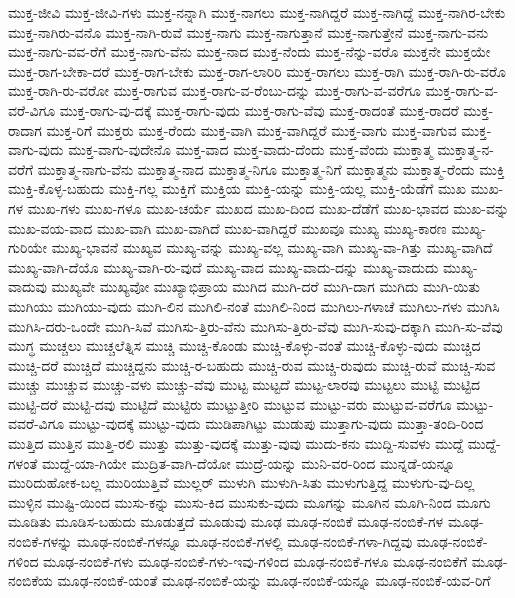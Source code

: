 {ಮುಕ್ತ-ಜೀವಿ
ಮುಕ್ತ-ಜೀವಿ-ಗಳು
ಮುಕ್ತ-ನನ್ನಾಗಿ
ಮುಕ್ತ-ನಾಗಲು
ಮುಕ್ತ-ನಾಗಿದ್ದರೆ
ಮುಕ್ತ-ನಾಗಿದ್ದೆ
ಮುಕ್ತ-ನಾಗಿರ-ಬೇಕು
ಮುಕ್ತ-ನಾಗಿರು-ವನೊ
ಮುಕ್ತ-ನಾಗಿ-ರುವೆ
ಮುಕ್ತ-ನಾಗು
ಮುಕ್ತ-ನಾಗುತ್ತಾನೆ
ಮುಕ್ತ-ನಾಗುತ್ತೇನೆ
ಮುಕ್ತ-ನಾಗು-ವನು
ಮುಕ್ತ-ನಾಗು-ವವ-ರೆಗೆ
ಮುಕ್ತ-ನಾಗು-ವೆನು
ಮುಕ್ತ-ನಾದ
ಮುಕ್ತ-ನೆಂದು
ಮುಕ್ತ-ನೆನ್ನು-ವರೊ
ಮುಕ್ತನೇ
ಮುಕ್ತಯೇ
ಮುಕ್ತ-ರಾಗ-ಬೇಕಾ-ದರೆ
ಮುಕ್ತ-ರಾಗ-ಬೇಕು
ಮುಕ್ತ-ರಾಗ-ಲಾರಿರಿ
ಮುಕ್ತ-ರಾಗಲು
ಮುಕ್ತ-ರಾಗಿ
ಮುಕ್ತ-ರಾಗಿ-ರು-ವರೊ
ಮುಕ್ತ-ರಾಗಿ-ರು-ವರೋ
ಮುಕ್ತ-ರಾಗುವ
ಮುಕ್ತ-ರಾಗು-ವ-ರೆಂಬು-ದನ್ನು
ಮುಕ್ತ-ರಾಗು-ವ-ವರೆಗೂ
ಮುಕ್ತ-ರಾಗು-ವ-ವರೆ-ವಿಗೂ
ಮುಕ್ತ-ರಾಗು-ವು-ದಕ್ಕೆ
ಮುಕ್ತ-ರಾಗು-ವುದು
ಮುಕ್ತ-ರಾಗು-ವೆವು
ಮುಕ್ತ-ರಾದಂತೆ
ಮುಕ್ತ-ರಾದರೆ
ಮುಕ್ತ-ರಾದಾಗ
ಮುಕ್ತ-ರಿಗೆ
ಮುಕ್ತರು
ಮುಕ್ತ-ರೆಂದು
ಮುಕ್ತ-ವಾಗಿ
ಮುಕ್ತ-ವಾಗಿದ್ದರೆ
ಮುಕ್ತ-ವಾಗು
ಮುಕ್ತ-ವಾಗುವ
ಮುಕ್ತ-ವಾಗು-ವುದು
ಮುಕ್ತ-ವಾಗು-ವುದೇನೊ
ಮುಕ್ತ-ವಾದ
ಮುಕ್ತ-ವಾದು-ದೆಂದು
ಮುಕ್ತ-ವೆಂದು
ಮುಕ್ತಾತ್ಮ
ಮುಕ್ತಾತ್ಮ-ನ-ವರೆಗೆ
ಮುಕ್ತಾತ್ಮ-ನಾಗು-ವೆನು
ಮುಕ್ತಾತ್ಮ-ನಾದ
ಮುಕ್ತಾತ್ಮ-ನಿಗೂ
ಮುಕ್ತಾತ್ಮ-ನಿಗೆ
ಮುಕ್ತಾತ್ಮನು
ಮುಕ್ತಾತ್ಮ-ರೆಂದು
ಮುಕ್ತಿ
ಮುಕ್ತಿ-ಕೊಳ್ಳ-ಬಹುದು
ಮುಕ್ತಿ-ಗಲ್ಲ
ಮುಕ್ತಿಗೆ
ಮುಕ್ತಿಯ
ಮುಕ್ತಿ-ಯನ್ನು
ಮುಕ್ತಿ-ಯಲ್ಲ
ಮುಕ್ತಿ-ಯೆಡೆಗೆ
ಮುಖ
ಮುಖ-ಗಳ
ಮುಖ-ಗಳು
ಮುಖ-ಗಳೂ
ಮುಖ-ಚರ್ಯೆ
ಮುಖದ
ಮುಖ-ದಿಂದ
ಮುಖ-ದೆಡೆಗೆ
ಮುಖ-ಭಾವದ
ಮುಖ-ವನ್ನು
ಮುಖ-ವಯ-ವಾದ
ಮುಖ-ವಾಗಿ
ಮುಖ-ವಾಗಿದೆ
ಮುಖ-ವಾಗಿದ್ದರೆ
ಮುಖವೂ
ಮುಖ್ಯ
ಮುಖ್ಯ-ಕಾರಣ
ಮುಖ್ಯ-ಗುರಿಯೇ
ಮುಖ್ಯ-ಭಾವನೆ
ಮುಖ್ಯವ
ಮುಖ್ಯ-ವನ್ನು
ಮುಖ್ಯ-ವಲ್ಲ
ಮುಖ್ಯ-ವಾಗಿ
ಮುಖ್ಯ-ವಾ-ಗಿತ್ತು
ಮುಖ್ಯ-ವಾಗಿದೆ
ಮುಖ್ಯ-ವಾಗಿ-ದೆಯೊ
ಮುಖ್ಯ-ವಾಗಿ-ರು-ವುದೆ
ಮುಖ್ಯ-ವಾದ
ಮುಖ್ಯ-ವಾದು-ದನ್ನು
ಮುಖ್ಯ-ವಾದುದು
ಮುಖ್ಯ-ವಾದುವು
ಮುಖ್ಯವೇ
ಮುಖ್ಯವೋ
ಮುಖ್ಯಾಭಿಪ್ರಾಯ
ಮುಗಿದ
ಮುಗಿ-ದರೆ
ಮುಗಿ-ದಾಗ
ಮುಗಿದು
ಮುಗಿ-ಯಿತು
ಮುಗಿಯು
ಮುಗಿಯು-ವುದು
ಮುಗಿ-ಲಿನ
ಮುಗಿಲಿ-ನಂತೆ
ಮುಗಿಲಿ-ನಿಂದ
ಮುಗಿಲು-ಗಳಾಚೆ
ಮುಗಿಲು-ಗಳು
ಮುಗಿಸಿ
ಮುಗಿಸಿ-ದರು-ಒಂದೇ
ಮುಗಿ-ಸಿವೆ
ಮುಗಿಸು-ತ್ತಿರು-ವೆನು
ಮುಗಿಸು-ತ್ತಿರು-ವೆವು
ಮುಗಿ-ಸುವು-ದಕ್ಕಾಗಿ
ಮುಗಿ-ಸು-ವೆವು
ಮುಗ್ಧ
ಮುಚ್ಚಲು
ಮುಚ್ಚಲೆತ್ನಿಸ
ಮುಚ್ಚಿ
ಮುಚ್ಚಿ-ಕೊಂಡು
ಮುಚ್ಚಿ-ಕೊಳ್ಳು-ವಂತೆ
ಮುಚ್ಚಿ-ಕೊಳ್ಳು-ವುದು
ಮುಚ್ಚಿದ
ಮುಚ್ಚಿ-ದರೆ
ಮುಚ್ಚಿದೆ
ಮುಚ್ಚಿದ್ದನು
ಮುಚ್ಚಿ-ರ-ಬಹುದು
ಮುಚ್ಚಿ-ರುವ
ಮುಚ್ಚಿ-ರುವುದು
ಮುಚ್ಚಿ-ರುವೆ
ಮುಚ್ಚಿ-ಸುವ
ಮುಚ್ಚು
ಮುಚ್ಚುವ
ಮುಚ್ಚು-ವಳು
ಮುಚ್ಚು-ವೆವು
ಮುಟ್ಟ
ಮುಟ್ಟದೆ
ಮುಟ್ಟ-ಲಾರವು
ಮುಟ್ಟಲು
ಮುಟ್ಟಿ
ಮುಟ್ಟಿದ
ಮುಟ್ಟಿ-ದರೆ
ಮುಟ್ಟಿ-ದವು
ಮುಟ್ಟಿದೆ
ಮುಟ್ಟಿರು
ಮುಟ್ಟುತ್ತೀರಿ
ಮುಟ್ಟುವ
ಮುಟ್ಟು-ವರು
ಮುಟ್ಟುವ-ವರೆಗೂ
ಮುಟ್ಟು-ವವರೆ-ವಿಗೂ
ಮುಟ್ಟು-ವುದಕ್ಕೆ
ಮುಟ್ಟು-ವುದು
ಮುಡಿಪಾಗಿಟ್ಟು
ಮುಡುಪು
ಮುತ್ತಾಗು-ವುದು
ಮುತ್ತಾ-ತಂದಿ-ರಿಂದ
ಮುತ್ತಿದ
ಮುತ್ತಿನ
ಮುತ್ತಿ-ರಲಿ
ಮುತ್ತು
ಮುತ್ತು-ವುದಕ್ಕೆ
ಮುತ್ತು-ವುವು
ಮುದು-ಕನು
ಮುದ್ದಿ-ಸುವಳು
ಮುದ್ದೆ
ಮುದ್ದೆ-ಗಳಂತೆ
ಮುದ್ದೆ-ಯಾ-ಗಿಯೇ
ಮುದ್ರಿತ-ವಾಗಿ-ದೆಯೋ
ಮುದ್ರೆ-ಯನ್ನು
ಮುನಿ-ವರ-ರಿಂದ
ಮುನ್ನಡೆ-ಯನ್ನೂ
ಮುರಿದುಹೋಕ-ಬಲ್ಲ
ಮುರಿಯುತ್ತಿವೆ
ಮುಲ್ಲರ್
ಮುಳುಗಿ
ಮುಳುಗಿ-ಸಿತು
ಮುಳುಗುತ್ತಿದ್ದ
ಮುಳುಗು-ವು-ದಿಲ್ಲ
ಮುಳ್ಳಿನ
ಮುಷ್ಟಿ-ಯಿಂದ
ಮುಸು-ಕನ್ನು
ಮುಸು-ಕಿದ
ಮುಸುಕು-ವುದು
ಮೂಗನ್ನು
ಮೂಗಿನ
ಮೂಗಿ-ನಿಂದ
ಮೂಗು
ಮೂಡಿತು
ಮೂಡಿಸ-ಬಹುದು
ಮೂಡುತ್ತದೆ
ಮೂಡುವು
ಮೂಢ
ಮೂಢ-ನಂಬಿಕೆ
ಮೂಢ-ನಂಬಿಕೆ-ಗಳ
ಮೂಢ-ನಂಬಿಕೆ-ಗಳನ್ನು
ಮೂಢ-ನಂಬಿಕೆ-ಗಳನ್ನೂ
ಮೂಢ-ನಂಬಿಕೆ-ಗಳಲ್ಲಿ
ಮೂಢ-ನಂಬಿಕೆ-ಗಳಾ-ಗಿದ್ದವು
ಮೂಢ-ನಂಬಿಕೆ-ಗಳಿಂದ
ಮೂಢ-ನಂಬಿಕೆ-ಗಳು
ಮೂಢ-ನಂಬಿಕೆ-ಗಳು-ಇವು-ಗಳಿಂದ
ಮೂಢ-ನಂಬಿಕೆ-ಗಳೂ
ಮೂಢ-ನಂಬಿಕೆಗೆ
ಮೂಢ-ನಂಬಿಕೆಯ
ಮೂಢ-ನಂಬಿಕೆ-ಯಂತೆ
ಮೂಢ-ನಂಬಿಕೆ-ಯನ್ನು
ಮೂಢ-ನಂಬಿಕೆ-ಯನ್ನೂ
ಮೂಢ-ನಂಬಿಕೆ-ಯವ-ರಿಗೆ
}
